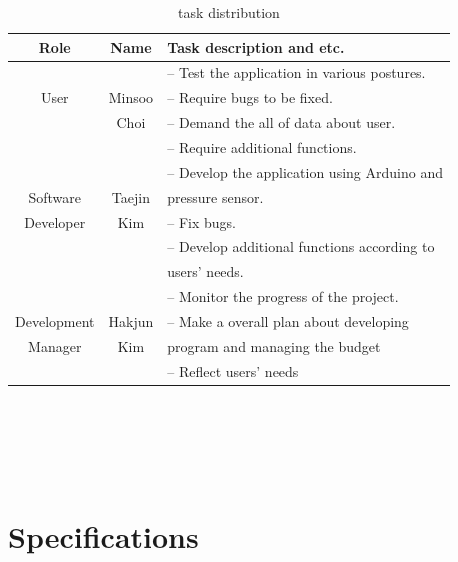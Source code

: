 \documentclass[conference]{IEEEtran}
\begin{document}
\renewcommand{\arrayrulewidth}{1pt}


\begin{table}[H]
\caption{task distribution}
\begin{tabular}{|c|c|l|}\hline
Role & Name & Task description and etc.\\ \hline \hline

&  &  -- Test the application in various postures. \\ 

User & Minsoo & -- Require bugs to be fixed.  \\ 

& Choi & -- Demand the all of data about user. \\ 

&  & -- Require additional functions. \\ \hline

&  &  -- Develop the application using Arduino and\\ 

Software & Taejin & pressure sensor. \\ 

Developer & Kim & -- Fix bugs. \\ 

&  & -- Develop additional functions according to\\ 

&  & users' needs. \\ \hline

&  &  -- Monitor the progress of the project. \\ 

Development & Hakjun & -- Make a overall plan about developing \\ 

Manager& Kim & program and managing the budget \\ 

&  & -- Reflect users' needs \\ \hline

\end{tabular}\\\\\\\\

\end{table}

\section{Specifications}
\end{document}
